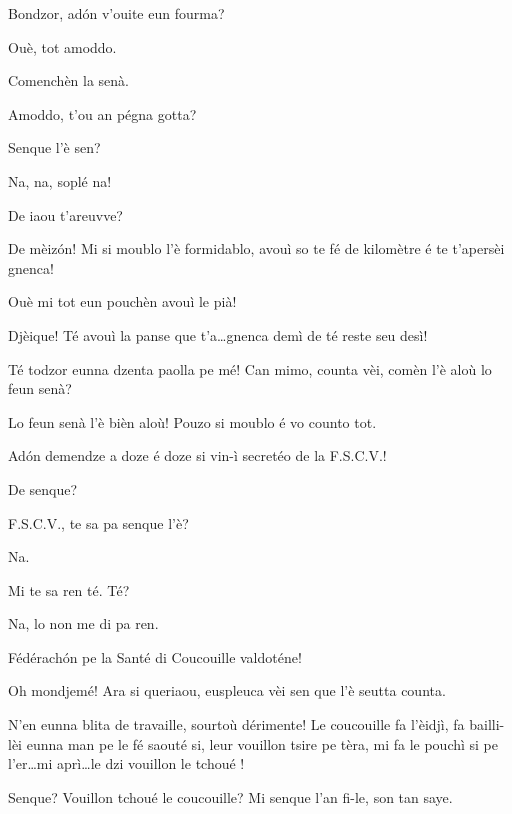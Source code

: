 \begin{drama}
\Richardspeaks{} Bondzor, ad\'on v'ouite eun fourma?

\Tuenospeaks Ouè, tot amoddo.

\Richardspeaks Comenchèn la senà.

\Gerominespeaks Amoddo,  t'ou an pégna got\-ta?

\Richardspeaks Senque l'è sen?


\Richardspeaks Na, na, soplé na!

\Tuenospeaks{} De iaou t'areuvve? 

\Richardspeaks De mèiz\'on! Mi si moublo l'è formidablo, avouì so te fé de kilomètre é te t'apersèi gnenca! 

\Tuenospeaks Ouè mi tot eun pouchèn avouì le pià!

\Richardspeaks Djèique! Té avouì la panse que t'a\ldots  gnenca demì de té reste seu desì!

\Tuenospeaks{} Té todzor eunna dzenta paolla pe mé! Can mimo, counta vèi, comèn l'è aloù lo feun senà?

\Richardspeaks Lo feun senà l'è bièn aloù! Pouzo si moublo é vo counto tot.


\Richardspeaks Ad\'on demendze a doze é doze si vin-ì secretéo de la F.S.C.V.!

\Tcheuttespeaks De senque?

\Richardspeaks{} F.S.C.V., te sa pa senque l'è?

\Tuenospeaks Na.

\Richardspeaks Mi te sa ren té.  Té?

\Gerominespeaks Na, lo non me di pa ren.

\Richardspeaks Fédérach\'on pe la Santé di Coucouille valdoténe!

\Tuenospeaks Oh mondjemé! Ara si queriaou, euspleuca vèi sen que l'è seutta counta.

\Richardspeaks N'en eunna blita de travaille, sourtoù dérimente! Le coucouille fa l'èidjì, fa bailli-lèi eunna man pe le fé saouté si, leur  vouillon tsire pe tèra, mi fa le pouchì si pe l'er\ldots mi aprì\ldots le dzi vouillon le tchoué \panico !

\Gerominespeaks Senque? Vouillon tchoué le coucouille? Mi senque l'an fi-le, son tan saye.


\end{drama}
